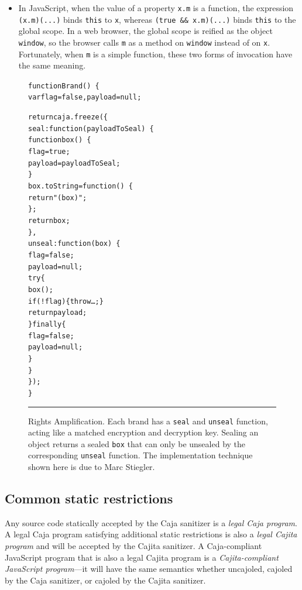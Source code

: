 \documentclass[letterpaper,twocolumn,10pt]{article}
\newcommand{\code}[1]{{\tt {#1}}}              %
\begin{document}
\begin{itemize}
  \item In JavaScript, when the value of a property \code{x.m} is a function, the expression \code{(x.m)(...)} 
  binds \code{this} to \code{x}, whereas \code{(true \&\& x.m)(...)} binds \code{this} to the global scope. 
  In a web browser, the global scope is reified as the object \code{window}, so the browser calls \code{m} 
  as a method on \code{window} instead of on \code{x}.  Fortunately, when \code{m} is a simple function, 
  these two forms of invocation have the same meaning.

\end{itemize}



\begin{figure}[t!]
\begin{alltt}
function Brand()\ \{
  var flag = false, payload = null;

  return caja.freeze(\{
    seal: function(payloadToSeal)\ \{
      function box()\ \{
        flag = true; 
        payload = payloadToSeal;
      \}
      box.toString = function()\ \{
        return "(box)";
      \};
      return box;
    \},
    unseal: function(box)\ \{
      flag = false; 
      payload = null;
      try \{
        box();
        if (!flag) \{ throw {\ldots}; \}
        return payload;
      \} finally \{
        flag = false; 
        payload = null;
      \}
    \}
  \});
\}
\end{alltt}

\caption[Rights Amplification]{Rights Amplification. Each brand has a 
\code{seal} and \code{unseal} function, acting like a matched encryption and 
decryption key. Sealing an object returns a sealed \code{box} that can only 
be unsealed by the corresponding \code{unseal} function. The implementation 
technique shown here is due to Marc Stiegler.
\\ } \hrule
\label{fig:rights-amp}
\end{figure}



\subsection{Common static restrictions}
\label{subsec:common-static}

Any source code statically accepted by the Caja sanitizer is a \emph{legal 
Caja program}. A legal Caja program satisfying additional static restrictions 
is also a \emph{legal Cajita program} and will be accepted by the Cajita 
sanitizer. A Caja-compliant JavaScript program that is also a legal Cajita 
program is a \emph{Cajita-compliant JavaScript program}---it will have the 
same semantics whether uncajoled, cajoled by the Caja sanitizer, or cajoled 
by the Cajita sanitizer.
\end{document}
